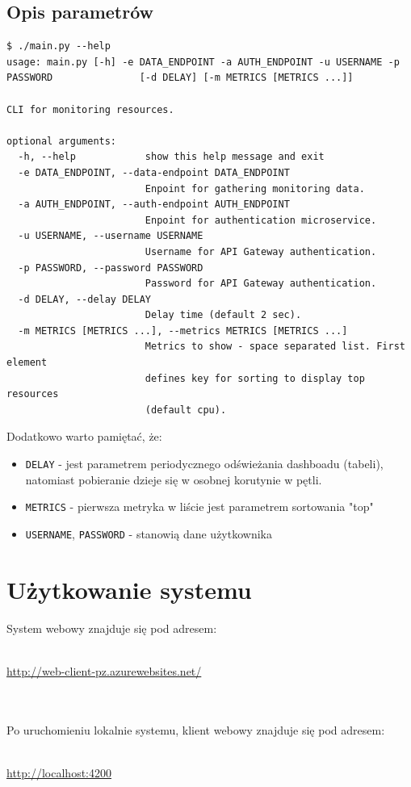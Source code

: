 \documentclass{article}
\begin{document}
\subsection{Opis parametrów}
\begin{lstlisting}
$ ./main.py --help
usage: main.py [-h] -e DATA_ENDPOINT -a AUTH_ENDPOINT -u USERNAME -p PASSWORD               [-d DELAY] [-m METRICS [METRICS ...]]

CLI for monitoring resources.

optional arguments:
  -h, --help            show this help message and exit
  -e DATA_ENDPOINT, --data-endpoint DATA_ENDPOINT
                        Enpoint for gathering monitoring data.
  -a AUTH_ENDPOINT, --auth-endpoint AUTH_ENDPOINT
                        Enpoint for authentication microservice.
  -u USERNAME, --username USERNAME
                        Username for API Gateway authentication.
  -p PASSWORD, --password PASSWORD
                        Password for API Gateway authentication.
  -d DELAY, --delay DELAY
                        Delay time (default 2 sec).
  -m METRICS [METRICS ...], --metrics METRICS [METRICS ...]
                        Metrics to show - space separated list. First element
                        defines key for sorting to display top resources
                        (default cpu).
\end{lstlisting}

Dodatkowo warto pamiętać, że:

\begin{itemize}
\item \texttt{DELAY} - jest parametrem periodycznego odświeżania dashboadu (tabeli), natomiast pobieranie dzieje się w osobnej korutynie w pętli.
\item \texttt{METRICS} - pierwsza metryka w liście jest parametrem sortowania "top"
\item \texttt{USERNAME}, \texttt{PASSWORD} - stanowią dane użytkownika
\end{itemize}

\section{Użytkowanie systemu}
System webowy znajduje się pod adresem:\\\\
\centerline{\url{http://web-client-pz.azurewebsites.net/}}\\\\
Po uruchomieniu lokalnie systemu, klient webowy znajduje się pod adresem:\\\\
\centerline{\url{http://localhost:4200}}\\\\
\end{document}
